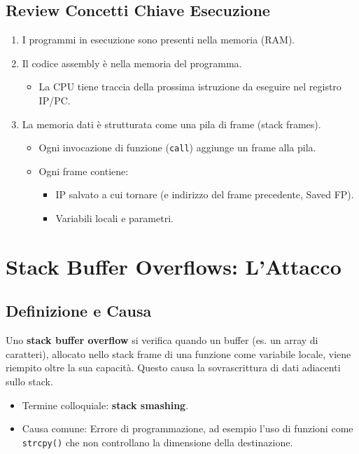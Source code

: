 \subsection{Review Concetti Chiave Esecuzione}
\begin{enumerate}
    \item I programmi in esecuzione sono presenti nella memoria (RAM).
    \item Il codice assembly è nella memoria del programma.
        \begin{itemize}
            \item La CPU tiene traccia della prossima istruzione da eseguire nel registro IP/PC.
        \end{itemize}
    \item La memoria dati è strutturata come una pila di frame (stack frames).
        \begin{itemize}
            \item Ogni invocazione di funzione (\texttt{call}) aggiunge un frame alla pila.
            \item Ogni frame contiene:
                \begin{itemize}
                    \item IP salvato a cui tornare (e indirizzo del frame precedente, Saved FP).
                    \item Variabili locali e parametri.
                \end{itemize}
        \end{itemize}
\end{enumerate}


\newpage
\section{Stack Buffer Overflows: L'Attacco}

\subsection{Definizione e Causa}
Uno \textbf{stack buffer overflow} si verifica quando un buffer (es. un array di caratteri), allocato nello stack frame di una funzione come variabile locale, viene riempito oltre la sua capacità. Questo causa la sovrascrittura di dati adiacenti sullo stack.
\begin{itemize}
    \item Termine colloquiale: \textbf{stack smashing}.
    \item Causa comune: Errore di programmazione, ad esempio l'uso di funzioni come \texttt{strcpy()} che non controllano la dimensione della destinazione.
\end{itemize}

